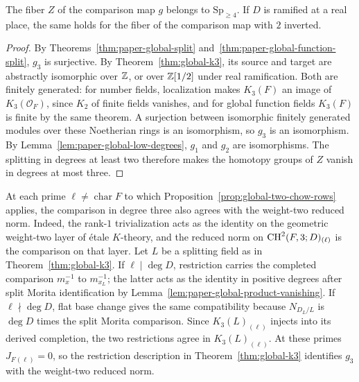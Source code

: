 \begin{corollary}\label{cor:global-fibre-connectivity}
The fiber $Z$ of the comparison map $g$ belongs to $\mathrm{Sp}_{\ge4}$.
If $D$ is ramified at a real place, the same holds for the fiber of the comparison map with $2$ inverted.
\end{corollary}
\begin{proof}
By Theorems~\ref{thm:paper-global-split} and~\ref{thm:paper-global-function-split}, $g_3$ is surjective.
By Theorem~\ref{thm:global-k3}, its source and target are abstractly isomorphic over $\mathbb Z$, or over $\mathbb Z[1/2]$ under real ramification.
Both are finitely generated: for number fields, localization makes $K_3(F)$ an image of $K_3(\mathcal O_F)$, since $K_2$ of finite fields vanishes, and for global function fields $K_3(F)$ is finite by the same theorem.
A surjection between isomorphic finitely generated modules over these Noetherian rings is an isomorphism, so $g_3$ is an isomorphism.
By Lemma~\ref{lem:paper-global-low-degrees}, $g_1$ and $g_2$ are isomorphisms.
The splitting in degrees at least two therefore makes the homotopy groups of $Z$ vanish in degrees at most three.
\end{proof}

\begin{remark}
At each prime $\ell\ne\operatorname{char}F$ to which Proposition~\ref{prop:global-two-chow-rows} applies, the comparison in degree three also agrees with the weight-two reduced norm.
Indeed, the rank-$1$ trivialization acts as the identity on the geometric weight-two layer of \'etale $K$-theory, and the reduced norm on $\operatorname{CH}^2(F,3;D)_{(\ell)}$ is the comparison on that layer.
Let $L$ be a splitting field as in Theorem~\ref{thm:global-k3}.
If $\ell\mid\deg D$, restriction carries the completed comparison $m_x^{-1}$ to $m_{x_L}^{-1}$; the latter acts as the identity in positive degrees after split Morita identification by Lemma~\ref{lem:paper-global-product-vanishing}.
If $\ell\nmid\deg D$, flat base change gives the same compatibility because $N_{D_L/L}$ is $\deg D$ times the split Morita comparison.
Since $K_3(L)_{(\ell)}$ injects into its derived completion, the two restrictions agree in $K_3(L)_{(\ell)}$.
At these primes $J_F{}_{(\ell)}=0$, so the restriction description in Theorem~\ref{thm:global-k3} identifies $g_3$ with the weight-two reduced norm.
\end{remark}

